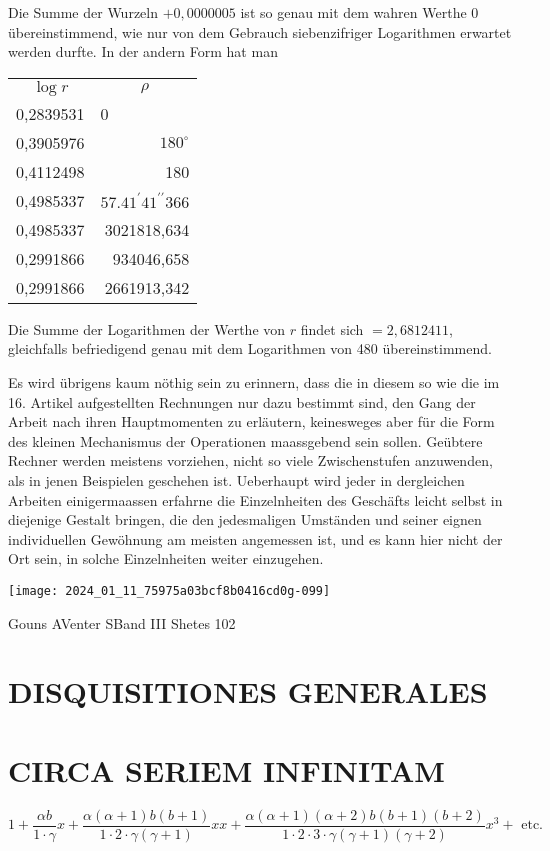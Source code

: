\documentclass[10pt]{article}
\begin{document}
Die Summe der Wurzeln \(+0,0000005\) ist so genau mit dem wahren Werthe 0 übereinstimmend, wie nur von dem Gebrauch siebenzifriger Logarithmen erwartet werden durfte. In der andern Form hat man

\begin{center}
\begin{tabular}{c|r}
\(\log r\) & \multicolumn{1}{|c}{\(\rho\)} \\
\cline { 2 - 2 }
0,2839531 & \multicolumn{1}{|l}{0} \\
0,3905976 & \(180^{\circ}\) \\
0,4112498 & 180 \\
0,4985337 & \(57.41^{\prime} 41^{\prime \prime} 366\) \\
0,4985337 & 3021818,634 \\
0,2991866 & 934046,658 \\
0,2991866 & 2661913,342 \\
\end{tabular}
\end{center}

Die Summe der Logarithmen der Werthe von \(r\) findet sich \(=2,6812411\), gleichfalls befriedigend genau mit dem Logarithmen von 480 übereinstimmend.

Es wird übrigens kaum nöthig sein zu erinnern, dass die in diesem so wie die im 16. Artikel aufgestellten Rechnungen nur dazu bestimmt sind, den Gang der Arbeit nach ihren Hauptmomenten zu erläutern, keinesweges aber für die Form des kleinen Mechanismus der Operationen maassgebend sein sollen. Geübtere Rechner werden meistens vorziehen, nicht so viele Zwischenstufen anzuwenden, als in jenen Beispielen geschehen ist. Ueberhaupt wird jeder in dergleichen Arbeiten einigermaassen erfahrne die Einzelnheiten des Geschäfts leicht selbst in diejenige Gestalt bringen, die den jedesmaligen Umständen und seiner eignen individuellen Gewöhnung am meisten angemessen ist, und es kann hier nicht der Ort sein, in solche Einzelnheiten weiter einzugehen.

\begin{center}
\texttt{[image: 2024\_01\_11\_75975a03bcf8b0416cd0g-099]}
\end{center}

Gouns AVenter SBand III Shetes 102

\section*{DISQUISITIONES GENERALES}
\section*{CIRCA SERIEM INFINITAM}
\[
1+\frac{\alpha b}{1 \cdot \gamma} x+\frac{\alpha(\alpha+1) b(b+1)}{1 \cdot 2 \cdot \gamma(\gamma+1)} x x+\frac{\alpha(\alpha+1)(\alpha+2) b(b+1)(b+2)}{1 \cdot 2 \cdot 3 \cdot \gamma(\gamma+1)(\gamma+2)} x^{3}+\text { etc. }
\]
\end{document}
